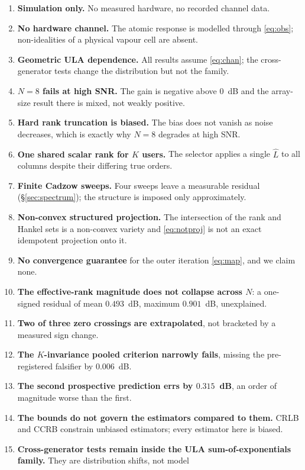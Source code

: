 \documentclass[journal]{IEEEtran}
\begin{document}
\begin{enumerate}
\item \textbf{Simulation only.} No measured hardware, no recorded channel data.
\item \textbf{No hardware channel.} The atomic response is modelled through
\eqref{eq:obs}; non-idealities of a physical vapour cell are absent.
\item \textbf{Geometric ULA dependence.} All results assume \eqref{eq:chan};
the cross-generator tests change the distribution but not the family.
\item \textbf{$N=8$ fails at high SNR.} The gain is negative above $0$~dB and
the array-size result there is mixed, not weakly positive.
\item \textbf{Hard rank truncation is biased.} The bias does not vanish as
noise decreases, which is exactly why $N=8$ degrades at high SNR.
\item \textbf{One shared scalar rank for $K$ users.} The selector applies a
single $\hat L$ to all columns despite their differing true orders.
\item \textbf{Finite Cadzow sweeps.} Four sweeps leave a measurable residual
(\S\ref{sec:spectrum}); the structure is imposed only approximately.
\item \textbf{Non-convex structured projection.} The intersection of the rank
and Hankel sets is a non-convex variety and \eqref{eq:notproj} is not an exact
idempotent projection onto it.
\item \textbf{No convergence guarantee} for the outer iteration
\eqref{eq:map}, and we claim none.
\item \textbf{The effective-rank magnitude does not collapse across $N$}: a
one-signed residual of mean $0.493$~dB, maximum $0.901$~dB, unexplained.
\item \textbf{Two of three zero crossings are extrapolated}, not bracketed by a
measured sign change.
\item \textbf{The $K$-invariance pooled criterion narrowly fails}, missing the
pre-registered falsifier by $0.006$~dB.
\item \textbf{The second prospective prediction errs by $0.315$~dB}, an order
of magnitude worse than the first.
\item \textbf{The bounds do not govern the estimators compared to them.} CRLB
and CCRB constrain unbiased estimators; every estimator here is biased.
\item \textbf{Cross-generator tests remain inside the ULA
sum-of-exponentials family.} They are distribution shifts, not model

\end{enumerate}
\end{document}
